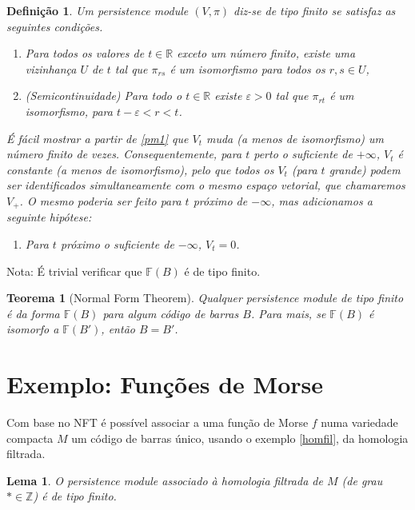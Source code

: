 \documentclass[11pt]{article}
\newtheorem{theorem}{Teorema}
\newtheorem{lemma}{Lema}
\newtheorem{definition}{Definição}
\theoremstyle{nonumberplain}
\newcommand{\R}{\mathbb{R}}
\newcommand{\Z}{\mathbb{Z}}
\newcommand{\FF}{\mathbb{F}}
\begin{document}
\begin{definition}
Um persistence module $(V,\pi)$ diz-se \emph{de tipo finito} se satisfaz as seguintes condições.
\begin{enumerate}[label=\roman*)]
\item\label{pm1} Para todos os valores de $t \in \R$ exceto um número finito, existe uma vizinhança $U$ de $t$ tal que $\pi_{rs}$ é um isomorfismo para todos os $r,s \in U$,
\item\label{pm2} \textit{(Semicontinuidade)} Para todo o $t \in \R$ existe $\varepsilon > 0$ tal que $\pi_{rt}$ é um isomorfismo, para $t-\varepsilon < r < t$.
\end{enumerate}

É fácil mostrar a partir de \ref{pm1} que $V_t$ muda (a menos de isomorfismo) um número finito de vezes. Consequentemente, para $t$ perto o suficiente de $+\infty$, $V_t$ é constante (a menos de isomorfismo), pelo que todos os $V_t$ (para $t$ grande) podem ser identificados simultaneamente com o mesmo espaço vetorial, que chamaremos $V_+$. O mesmo poderia ser feito para $t$ próximo de $-\infty$, mas adicionamos a seguinte hipótese:

\begin{enumerate}[resume*]
\item\label{pm3} Para $t$ próximo o suficiente de $-\infty$, $V_t = 0$.
\end{enumerate}
\end{definition}

Nota: É trivial verificar que $\FF(B)$ é de tipo finito.

\begin{theorem}[Normal Form Theorem]
Qualquer persistence module de tipo finito é da forma $\FF(B)$ para algum código de barras $B$. Para mais, se $\FF(B)$ é isomorfo a $\FF(B')$, então $B = B'$.
\end{theorem}

\section{Exemplo: Funções de Morse}

Com base no NFT é possível associar a uma função de Morse $f$ numa variedade compacta $M$ um código de barras único, usando o exemplo \ref{homfil}, da homologia filtrada.

\begin{lemma}
O persistence module associado à homologia filtrada de $M$ (de grau $* \in \Z$) é de tipo finito.
\end{lemma}
\end{document}

